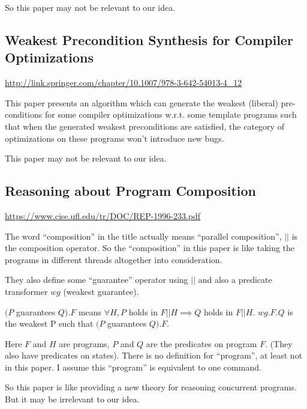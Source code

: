 \documentclass[fleqn]{article}
\begin{document}
So this paper may not be relevant to our idea.


\subsection{Weakest Precondition Synthesis for Compiler Optimizations}

\url{http://link.springer.com/chapter/10.1007/978-3-642-54013-4_12}

\bigskip

This paper presents an algorithm which can generate the weakest
(liberal) pre-conditions for some compiler optimizations w.r.t. some
template programs such that when the generated weakest preconditions
are satisfied, the category of optimizations on these programs won't
introduce new bugs.

This paper may not be relevant to our idea.


\subsection{Reasoning about Program Composition}

\url{https://www.cise.ufl.edu/tr/DOC/REP-1996-233.pdf}

\bigskip

The word ``composition'' in the title actually means ``parallel
composition'', $||$ is the composition operator. So the
``composition'' in this paper is like taking the programs in different
threads altogether into consideration.

They also define some ``guarantee'' operator using $||$ and also a
predicate transformer $wg$ (weakest guarantee).

$(P$ guarantees $Q).F$ means $\forall H, P$ holds in $F || H \implies
Q$ holds in $F || H$. $wg.F.Q$ is the weakest P such that $(P$
guarantees $Q).F$.

Here $F$ and $H$ are programs, $P$ and $Q$ are the predicates on
program $F$. (They also have predicates on states). There is no
definition for ``program'', at least not in this paper. I assume this
``program'' is equivalent to one command.

So this paper is like providing a new theory for reasoning concurrent
programs. But it may be irrelevant to our idea.

\end{document}
